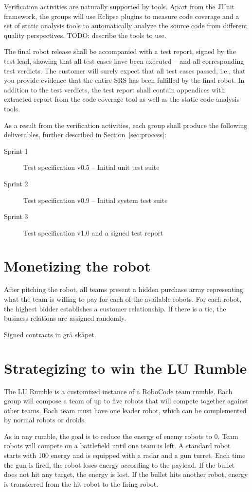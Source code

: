 \documentclass{scrreprt}
\begin{document}
Verification activities are naturally supported by tools. Apart from the JUnit framework, the groups will use Eclipse plugins to measure code coverage and a set of static analysis tools to automatically analyze the source code from different quality perspectives. TODO: describe the tools to use.

The final robot release shall be accompanied with a test report, signed by the test lead, showing that all test cases have been executed -- and all corresponding test verdicts. The customer will surely expect that all test cases passed, i.e., that you provide evidence that the entire SRS has been fulfilled by the final robot. In addition to the test verdicts, the test report shall contain appendices with extracted report from the code coverage tool as well as the static code analysis tools.

As a result from the verification activities, each group shall produce the following deliverables, further described in Section~\ref{sec:process}:
\begin{description}
\item[Sprint 1] Test specification v0.5 -- Initial unit test suite
\item[Sprint 2] Test specification v0.9 -- Initial system test suite
\item[Sprint 3] Test specification v1.0 and a signed test report
\end{description}

\chapter{Monetizing the robot}
After pitching the robot, all teams present a hidden purchase array representing what the team is willing to pay for each of the available robots. For each robot, the highest bidder establishes a customer relationship. If there is a tie, the business relations are assigned randomly.

Signed contracts in grå skåpet.

\chapter{Strategizing to win the LU Rumble}
The LU Rumble is a customized instance of a RoboCode team rumble. Each group will compose a team of up to five robots that will compete together against other teams. Each team must have one leader robot, which can be complemented by normal robots or droids.

As in any rumble, the goal is to reduce the energy of enemy robots to 0. Team robots will compete on a battlefield until one team is left. A standard robot starts with 100 energy and is equipped with a radar and a gun turret. Each time the gun is fired, the robot loses energy according to the payload. If the bullet does not hit any target, the energy is lost. If the bullet hits another robot, energy is transferred from the hit robot to the firing robot.
\end{document}
